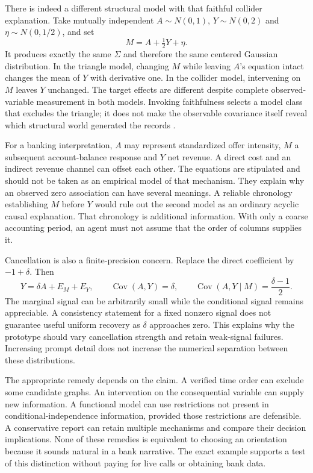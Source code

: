 There is indeed a different structural model with that faithful collider
explanation. Take mutually independent $A\sim N(0,1)$, $Y\sim N(0,2)$
and $\eta\sim N(0,1/2)$, and set
\[
 M=A+\tfrac12Y+\eta.
\]
It produces exactly the same $\Sigma$ and therefore the same centered
Gaussian distribution. In the triangle model, changing $M$ while leaving
$A$'s equation intact changes the mean of $Y$ with derivative one. In the
collider model, intervening on $M$ leaves $Y$ unchanged. The target effects
are different despite complete observed-variable measurement in both models.
Invoking faithfulness selects a model class that excludes the triangle; it
does not make the observable covariance itself reveal which structural world
generated the records \citep{exec14_discovery_design_oracles}.

For a banking interpretation, $A$ may represent standardized offer intensity,
$M$ a subsequent account-balance response and $Y$ net revenue. A direct cost
and an indirect revenue channel can offset each other. The equations are
stipulated and should not be taken as an empirical model of that mechanism.
They explain why an observed zero association can have several meanings.
A reliable chronology establishing $M$ before $Y$ would rule out the second
model as an ordinary acyclic causal explanation. That chronology is additional
information. With only a coarse accounting period, an agent must not assume
that the order of columns supplies it.

Cancellation is also a finite-precision concern. Replace the direct
coefficient by $-1+\delta$. Then
\[
 Y=\delta A+E_M+E_Y,\qquad
 \operatorname{Cov}(A,Y)=\delta,
 \qquad \operatorname{Cov}(A,Y\mid M)=\frac{\delta-1}{2}.
\]
The marginal signal can be arbitrarily small while the conditional signal
remains appreciable. A consistency statement for a fixed nonzero signal does
not guarantee useful uniform recovery as $\delta$ approaches zero. This
explains why the prototype should vary cancellation strength and retain
weak-signal failures. Increasing prompt detail does not increase the numerical
separation between these distributions.

The appropriate remedy depends on the claim. A verified time order can exclude
some candidate graphs. An intervention on the consequential variable can
supply new information. A functional model can use restrictions not present
in conditional-independence information, provided those restrictions are
defensible. A conservative report can retain multiple mechanisms and compare
their decision implications. None of these remedies is equivalent to choosing
an orientation because it sounds natural in a bank narrative. The exact
example supports a test of this distinction without paying for live calls or
obtaining bank data.

